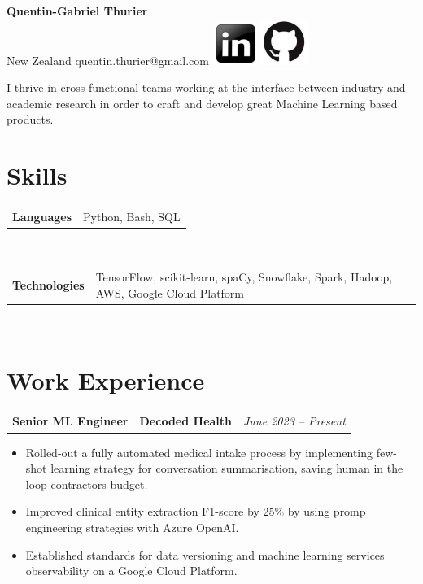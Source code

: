 \documentclass[letterpaper,11pt]{article}
\newcommand{\resumeItem}[1]{
  \item\small{#1 \vspace{-6pt}}
}
\newcommand{\resumeItemListStart}{\begin{itemize}[label=$\circ$, topsep=0.2cm, leftmargin=0.6cm]}
\newcommand{\resumeItemListEnd}{\end{itemize}\vspace{8pt}}
\newcommand{\job}[4]{
    \begin{tabular}{p{7cm}p{6cm}p{5cm}}
      \hspace{-0.7em} \textbf{#1} & \textbf{\small{#2}} & \hfill \textit{\small{#4}}
    \end{tabular}
}
\newcommand{\skillGroup}[2]{
    \begin{tabular}{p{7cm}p{11cm}}
      \hspace{-0.7em} \textbf{\small{#1}} & \small{#2}
    \end{tabular}
}
\begin{document}
 

\begin{center}
  \textbf{\Large Quentin-Gabriel Thurier} \\
  \small{New Zealand} \textbar{}
  \small{quentin.thurier@gmail.com} \textbar{}
  \href{https://www.linkedin.com/in/quentin-gabriel-thurier-36586021/}{\includegraphics[scale=0.6,valign=b]{linkedin}} \href{https://github.com/qthurier}{\includegraphics[scale=0.6, valign=b]{github}} 
\end{center}

I thrive in cross functional teams working at the interface between industry and academic research in order to craft and develop great Machine Learning based products. 
\section{Skills}
\skillGroup {Languages}{Python, Bash, SQL}\\
\skillGroup {Technologies}{TensorFlow, scikit-learn, spaCy, Snowflake, Spark, Hadoop, AWS, Google Cloud Platform}\\

\section{Work Experience}
	
  \job {Senior ML Engineer}{Decoded Health}{Auckland}{June 2023 -- Present}
    \resumeItemListStart
      \resumeItem {Rolled-out a fully automated medical intake process by implementing few-shot learning strategy for conversation summarisation, saving human in the loop contractors budget.}
      \resumeItem {Improved clinical entity extraction F1-score by 25\% by using promp engineering strategies with Azure OpenAI.}
      \resumeItem {Established standards for data versioning and machine learning services observability on a Google Cloud Platform.}
    \resumeItemListEnd
\end{document}
